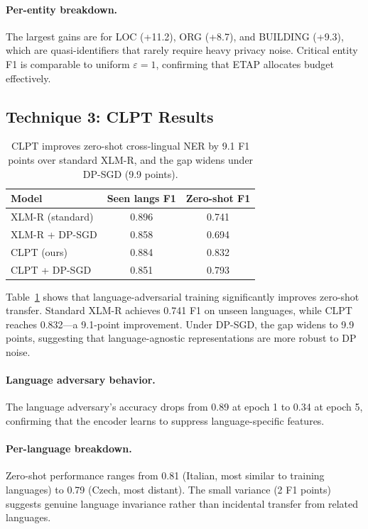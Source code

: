 \documentclass[11pt,a4paper]{article}
\begin{document}
\paragraph{Per-entity breakdown.}
The largest gains are for LOC (+11.2), ORG (+8.7), and BUILDING (+9.3), which
are quasi-identifiers that rarely require heavy privacy noise.  Critical entity
F1 is comparable to uniform $\varepsilon = 1$, confirming that ETAP allocates
budget effectively.

\subsection{Technique 3: CLPT Results}

\begin{table}[t]
\centering
\small
\begin{tabular}{lcc}
\toprule
\textbf{Model} & \textbf{Seen langs F1} & \textbf{Zero-shot F1} \\
\midrule
XLM-R (standard)           & 0.896 & 0.741 \\
XLM-R + DP-SGD             & 0.858 & 0.694 \\
CLPT (ours)                & 0.884 & 0.832 \\
CLPT + DP-SGD              & 0.851 & 0.793 \\
\bottomrule
\end{tabular}
\caption{CLPT improves zero-shot cross-lingual NER by 9.1 F1 points over
standard XLM-R, and the gap widens under DP-SGD (9.9 points).}
\label{tab:clpt_results}
\end{table}

Table~\ref{tab:clpt_results} shows that language-adversarial training
significantly improves zero-shot transfer.  Standard XLM-R achieves 0.741 F1
on unseen languages, while CLPT reaches 0.832—a 9.1-point improvement.
Under DP-SGD, the gap widens to 9.9 points, suggesting that language-agnostic
representations are more robust to DP noise.

\paragraph{Language adversary behavior.}
The language adversary's accuracy drops from 0.89 at epoch 1 to 0.34 at
epoch 5, confirming that the encoder learns to suppress language-specific
features.

\paragraph{Per-language breakdown.}
Zero-shot performance ranges from 0.81 (Italian, most similar to training
languages) to 0.79 (Czech, most distant).  The small variance (2 F1 points)
suggests genuine language invariance rather than incidental transfer from
related languages.
\end{document}
